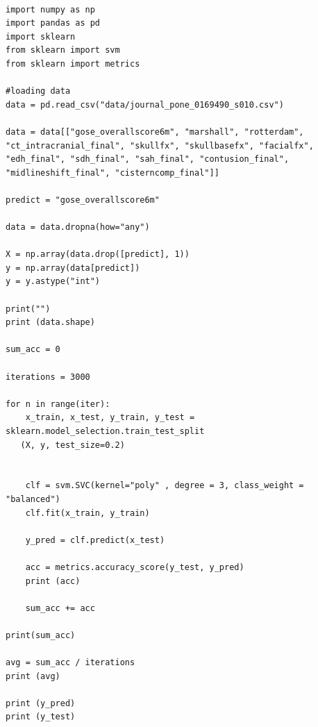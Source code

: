 \documentclass[11pt]{article}
\begin{document}
\begin{verbatim}

import numpy as np
import pandas as pd
import sklearn
from sklearn import svm
from sklearn import metrics

#loading data
data = pd.read_csv("data/journal_pone_0169490_s010.csv")

data = data[["gose_overallscore6m", "marshall", "rotterdam",
"ct_intracranial_final", "skullfx", "skullbasefx", "facialfx",
"edh_final", "sdh_final", "sah_final", "contusion_final",
"midlineshift_final", "cisterncomp_final"]]

predict = "gose_overallscore6m"

data = data.dropna(how="any")

X = np.array(data.drop([predict], 1))
y = np.array(data[predict])
y = y.astype("int")

print("")
print (data.shape)

sum_acc = 0

iterations = 3000

for n in range(iter):
    x_train, x_test, y_train, y_test = sklearn.model_selection.train_test_split
   (X, y, test_size=0.2)


    clf = svm.SVC(kernel="poly" , degree = 3, class_weight = "balanced")
    clf.fit(x_train, y_train)

    y_pred = clf.predict(x_test)

    acc = metrics.accuracy_score(y_test, y_pred)
    print (acc)

    sum_acc += acc

print(sum_acc)

avg = sum_acc / iterations
print (avg)

print (y_pred)
print (y_test)

\end{verbatim}
\end{document}

